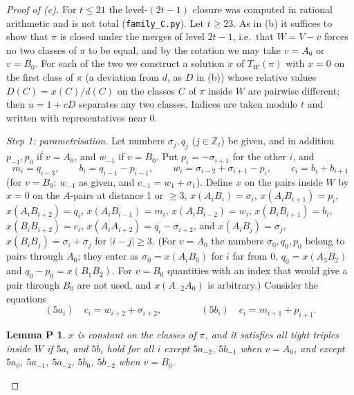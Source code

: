 \documentclass[11pt,a4paper]{article}
\newtheorem*{lemmaP}{Lemma P}
\theoremstyle{definition}
\theoremstyle{remark}
\newcommand{\Z}{\mathbb{Z}}
\newcommand{\file}[1]{\texttt{#1}}
\newcommand{\step}[1]{\smallskip\noindent\emph{#1}}
\begin{document}
\begin{proof}[Proof of (c)]
For $t \le 21$ the level-$(2t - 1)$ closure was computed in rational arithmetic and is not total
(\file{family\_C.py}). Let $t \ge 23$. As in (b) it suffices to show that $\pi$ is closed under the merges of level
$2t - 1$, i.e.\ that $W = V - v$ forces no two classes of $\pi$ to be equal, and by the rotation we may take
$v = A_0$ or $v = B_0$. For each of the two we construct a solution $x$ of $T_W(\pi)$ with $x = 0$ on the first
class of $\pi$ (a deviation from $d$, as $D$ in (b)) whose relative values $D(C) = x(C)/d(C)$ on the classes $C$ of
$\pi$ inside $W$ are pairwise different; then $u = 1 + cD$ separates any two classes. Indices are taken modulo $t$
and written with representatives near $0$.

\step{Step 1: parametrisation.} Let numbers $\sigma_j, q_j$ ($j \in \Z_t$) be given, and in addition $p_{-1}, p_0$
if $v = A_0$, and $w_{-1}$ if $v = B_0$. Put $p_i = -\sigma_{i+1}$ for the other $i$, and
\[
  m_i = q_{i-3}, \qquad b_i = q_{i-1} - p_{i-1}, \qquad w_i = \sigma_{i-2} + \sigma_{i+1} - p_i, \qquad
  c_i = b_i + b_{i+1}
\]
(for $v = B_0$: $w_{-1}$ as given, and $c_{-1} = w_1 + \sigma_1$). Define $x$ on the pairs inside $W$ by $x = 0$ on
the $A$-pairs at distance 1 or $\ge 3$, $x(A_iB_i) = \sigma_i$, $x(A_iB_{i+1}) = p_i$, $x(A_iB_{i+2}) = q_i$,
$x(A_iB_{i-1}) = m_i$, $x(A_iB_{i-2}) = w_i$, $x(B_iB_{i+1}) = b_i$, $x(B_iB_{i+2}) = c_i$,
$x(A_iA_{i+2}) = q_i - \sigma_{i+2}$, and $x(A_iB_j) = \sigma_j$, $x(B_iB_j) = \sigma_i + \sigma_j$ for
$|i - j| \ge 3$. (For $v = A_0$ the numbers $\sigma_0, q_0, p_0$ belong to pairs through $A_0$; they enter as
$\sigma_0 = x(A_iB_0)$ for $i$ far from $0$, $q_0 = x(A_3B_2)$ and $q_0 - p_0 = x(B_1B_2)$. For $v = B_0$ quantities
with an index that would give a pair through $B_0$ are not used, and $x(A_{-2}A_0)$ is arbitrary.) Consider the
equations
\[
  (5a_i)\quad c_i = w_{i+2} + \sigma_{i+2}, \qquad\qquad (5b_i)\quad c_i = m_{i+1} + p_{i+1}.
\]

\begin{lemmaP}
$x$ is constant on the classes of $\pi$, and it satisfies all tight triples inside $W$ if $5a_i$ and $5b_i$ hold for
all $i$ except $5a_{-2}$, $5b_{-1}$ when $v = A_0$, and except $5a_0$, $5a_{-1}$, $5a_{-2}$, $5b_0$, $5b_{-2}$ when
$v = B_0$.
\end{lemmaP}


\end{proof}
\end{document}
